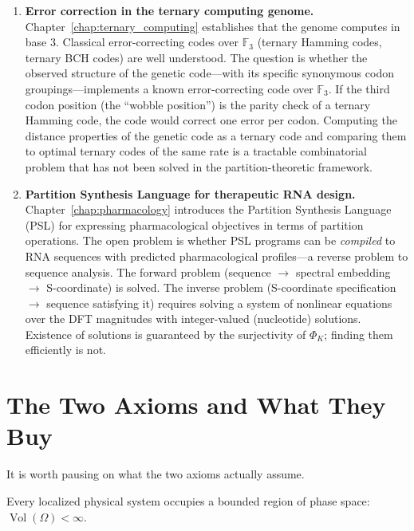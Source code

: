 \begin{enumerate}[label=\textbf{OP\arabic*.}]
  \item \textbf{Error correction in the ternary computing genome.}
        Chapter~\ref{chap:ternary_computing} establishes that the genome
        computes in base 3. Classical error-correcting codes over $\mathbb{F}_3$
        (ternary Hamming codes, ternary BCH codes) are well understood.
        The question is whether the observed structure of the genetic code---with
        its specific synonymous codon groupings---implements a known error-correcting
        code over $\mathbb{F}_3$. If the third codon position (the ``wobble position'')
        is the parity check of a ternary Hamming code, the code would correct
        one error per codon. Computing the distance properties of the genetic
        code as a ternary code and comparing them to optimal ternary codes of
        the same rate is a tractable combinatorial problem that has not been
        solved in the partition-theoretic framework.

  \item \textbf{Partition Synthesis Language for therapeutic RNA design.}
        Chapter~\ref{chap:pharmacology} introduces the Partition Synthesis
        Language (PSL) for expressing pharmacological objectives in terms of
        partition operations. The open problem is whether PSL programs can be
        \emph{compiled} to RNA sequences with predicted pharmacological
        profiles---a reverse problem to sequence analysis. The forward problem
        (sequence $\to$ spectral embedding $\to$ S-coordinate) is solved.
        The inverse problem (S-coordinate specification $\to$ sequence satisfying it)
        requires solving a system of nonlinear equations over the DFT magnitudes
        with integer-valued (nucleotide) solutions. Existence of solutions is
        guaranteed by the surjectivity of $\Phi_K$; finding them efficiently
        is not.
\end{enumerate}

\section{The Two Axioms and What They Buy}
\label{sec:two_axioms_summary}

It is worth pausing on what the two axioms actually assume.

\begin{axiom}
Every localized physical system occupies a bounded region of phase space:
$\operatorname{Vol}(\Omega) < \infty$.
\end{axiom}

